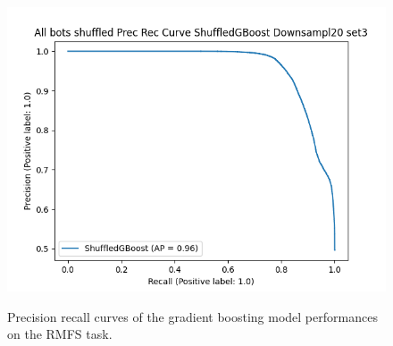 \documentclass[../../Thesis.tex]{subfiles}
\begin{document}
\begin{figure}
{							\includegraphics[scale=0.31]{../../Images/Experiments/warehouse_images/All_bots_shuffled_Prec_Rec_Curve_ShuffledGBoost_Downsampl20_set3.png}
					}
					\caption{Precision recall curves of the gradient boosting model performances on the RMFS task.}
					\label{fig:RMFS_precision_recall_curves}
				\end{figure}
			
\end{document}
